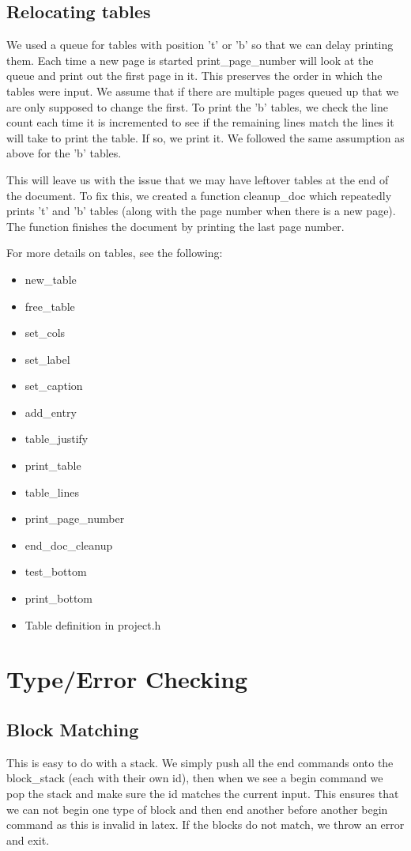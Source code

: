 \subsection{Relocating tables}
We used a queue for tables with position 't' or 'b' so that we can delay printing
them. Each time a new page is started print_page_number will look at the queue and print
out the first page in it. This preserves the order in which the tables were input. We
assume that if there are multiple pages queued up that we are only supposed to change the
first. To print the 'b' tables, we check the line count each time it is incremented to see
if the remaining lines match the lines it will take to print the table. If so, we print it.
We followed the same assumption as above for the 'b' tables.

This will leave us with the issue that we may have leftover tables at the end of the
document. To fix this, we created a function cleanup_doc which repeatedly prints 't' and 'b'
tables (along with the page number when there is a new page). The function finishes the 
document by printing the last page number.

For more details on tables, see the following:
\begin{itemize}
\item new_table
\item free_table
\item set_cols
\item set_label
\item set_caption
\item add_entry
\item table_justify
\item print_table
\item table_lines
\item print_page_number
\item end_doc_cleanup
\item test_bottom
\item print_bottom
\item Table definition in project.h
\end{itemize}

\section{Type/Error Checking}

\subsection{Block Matching}
This is easy to do with a stack. We simply push all the end commands onto the block_stack
(each with their own id), then when we see a begin command we pop the stack and make sure
the id matches the current input. This ensures that we can not begin one type of block and
then end another before another begin command as this is invalid in latex. If the blocks
do not match, we throw an error and exit.

